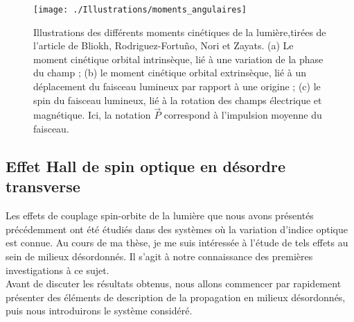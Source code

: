 \documentclass[a4paper,11pt]{article} %
\begin{document}
	
	
	\begin{figure}[h]
		\centering
		\begin{minipage}[c]{0.9\linewidth}
			\centering
			\texttt{[image: ./Illustrations/moments\_angulaires]}
			\caption{Illustrations des différents moments cinétiques de la lumière,tirées de l'article de Bliokh, Rodriguez-Fortuño, Nori et Zayats. (a) Le moment cinétique orbital intrinsèque, lié à une variation de la phase du champ ; (b) le moment cinétique orbital extrinsèque, lié à un déplacement du faisceau lumineux par rapport à une origine ; (c) le spin du faisceau lumineux, lié à la rotation des champs électrique et magnétique. Ici, la notation $ \vec{P} $ correspond à l'impulsion moyenne du faisceau.}
			\label{fig:moments_angulaires}
		\end{minipage}
	\end{figure}
	
	
	\subsection{Effet Hall de spin optique en désordre transverse}
	Les effets de couplage spin-orbite de la lumière que nous avons présentés précédemment ont été étudiés dans des systèmes où la variation d'indice optique est connue. Au cours de ma thèse, je me suis intéressée à l'étude de tels effets au sein de milieux désordonnés. Il s'agit à notre connaissance des premières investigations à ce sujet.\\
	Avant de discuter les résultats obtenus, nous allons commencer par rapidement présenter des éléments de description de la propagation en milieux désordonnés, puis nous introduirons le système considéré.
	
\end{document}
